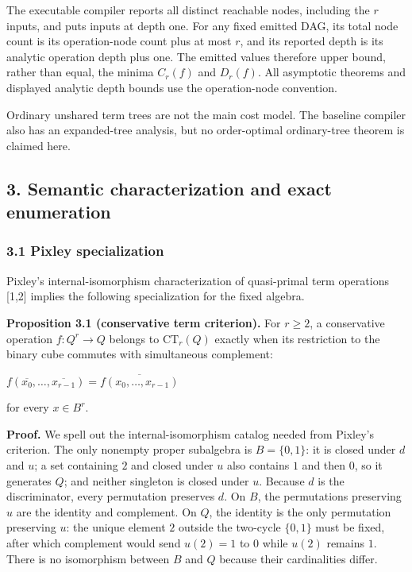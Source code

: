 \documentclass[
  11pt,
]{article}
\theoremstyle{definition}
\theoremstyle{remark}
\begin{document}
The executable compiler reports all distinct reachable nodes, including
the \(r\) inputs, and puts inputs at depth one. For any fixed emitted
DAG, its total node count is its operation-node count plus at most
\(r\), and its reported depth is its analytic operation depth plus one.
The emitted values therefore upper bound, rather than equal, the minima
\(C_r(f)\) and \(D_r(f)\). All asymptotic theorems and displayed
analytic depth bounds use the operation-node convention.

Ordinary unshared term trees are not the main cost model. The baseline
compiler also has an expanded-tree analysis, but no order-optimal
ordinary-tree theorem is claimed here.

\hypertarget{semantic-characterization-and-exact-enumeration}{%
\subsection{3. Semantic characterization and exact
enumeration}\label{semantic-characterization-and-exact-enumeration}}

\hypertarget{pixley-specialization}{%
\subsubsection{3.1 Pixley specialization}\label{pixley-specialization}}

Pixley's internal-isomorphism characterization of quasi-primal term
operations {[}1,2{]} implies the following specialization for the fixed
algebra.

\textbf{Proposition 3.1 (conservative term criterion).} For \(r\ge 2\),
a conservative operation \(f:Q^r\to Q\) belongs to \(\mathrm{CT}_r(Q)\)
exactly when its restriction to the binary cube commutes with
simultaneous complement:

\(f(\overline{x_0},\ldots ,\overline{x_{r-1}}) = \overline{f(x_0,\ldots ,x_{r-1})}\)

for every \(x \in B^r\).

\textbf{Proof.} We spell out the internal-isomorphism catalog needed
from Pixley's criterion. The only nonempty proper subalgebra is
\(B=\{0,1\}\): it is closed under \(d\) and \(u\); a set containing
\(2\) and closed under \(u\) also contains \(1\) and then \(0\), so it
generates \(Q\); and neither singleton is closed under \(u\). Because
\(d\) is the discriminator, every permutation preserves \(d\). On \(B\),
the permutations preserving \(u\) are the identity and complement. On
\(Q\), the identity is the only permutation preserving \(u\): the unique
element \(2\) outside the two-cycle \(\{0,1\}\) must be fixed, after
which complement would send \(u(2)=1\) to \(0\) while \(u(2)\) remains
\(1\). There is no isomorphism between \(B\) and \(Q\) because their
cardinalities differ.
\end{document}

